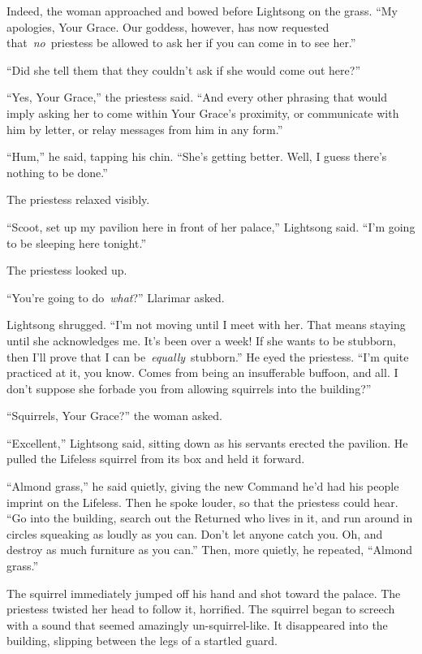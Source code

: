 Indeed, the woman approached and bowed before Lightsong on the grass. “My apologies, Your Grace. Our goddess, however, has now requested that~\textit{no}~priestess be allowed to ask her if you can come in to see her.”

“Did she tell them that they couldn’t ask if she would come out here?”

“Yes, Your Grace,” the priestess said. “And every other phrasing that would imply asking her to come within Your Grace’s proximity, or communicate with him by letter, or relay messages from him in any form.”

“Hum,” he said, tapping his chin. “She’s getting better. Well, I guess there’s nothing to be done.”

The priestess relaxed visibly.

“Scoot, set up my pavilion here in front of her palace,” Lightsong said. “I’m going to be sleeping here tonight.”

The priestess looked up.

“You’re going to do~\textit{what}?” Llarimar asked.

Lightsong shrugged. “I’m not moving until I meet with her. That means staying until she acknowledges me. It’s been over a week! If she wants to be stubborn, then I’ll prove that I can be~\textit{equally}~stubborn.” He eyed the priestess. “I’m quite practiced at it, you know. Comes from being an insufferable buffoon, and all. I don’t suppose she forbade you from allowing squirrels into the building?”

“Squirrels, Your Grace?” the woman asked.

“Excellent,” Lightsong said, sitting down as his servants erected the pavilion. He pulled the Lifeless squirrel from its box and held it forward.

“Almond grass,” he said quietly, giving the new Command he’d had his people imprint on the Lifeless. Then he spoke louder, so that the priestess could hear. “Go into the building, search out the Returned who lives in it, and run around in circles squeaking as loudly as you can. Don’t let anyone catch you. Oh, and destroy as much furniture as you can.” Then, more quietly, he repeated, “Almond grass.”

The squirrel immediately jumped off his hand and shot toward the palace. The priestess twisted her head to follow it, horrified. The squirrel began to screech with a sound that seemed amazingly un-squirrel-like. It disappeared into the building, slipping between the legs of a startled guard.

